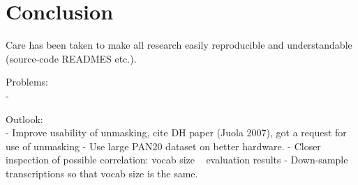 \chapter{Conclusion}\label{conclusion}

Care has been taken to make all research easily reproducible and understandable (source-code READMES etc.).


Problems:\\
-

Outlook:\\
- Improve usability of unmasking, cite DH paper (Juola 2007), got a request for use of unmasking
- Use large PAN20 dataset on better hardware.
- Closer inspection of possible correlation: vocab size ~ evaluation results
- Down-sample transcriptions so that vocab size is the same.